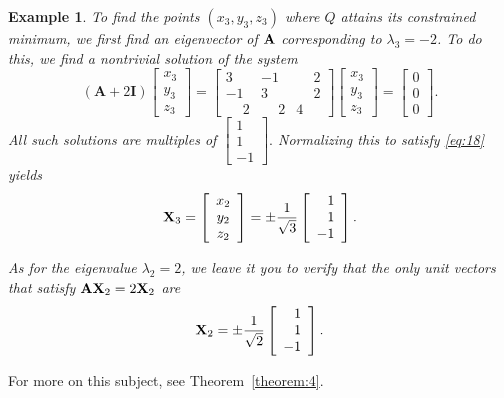\documentclass{article}
\newtheorem{example}{Example}
\begin{document}
\begin{example}
To find the points $(x_{3},y_{3},z_{3})$ where $Q$ attains its
constrained minimum, we first find an eigenvector of ${\bf A}$
corresponding
to $\lambda_{3}=-2$. To do this, we find a nontrivial solution of the
system
$$
(\mathbf{A}+2\mathbf{I})
\left[\begin{array}{ccccccc}
 x_{3}\\ y_{3}\\ z_{3}
\end{array}\right]=
\left[\begin{array}{rrrcccc}
 3 & -1 & \phantom{-}2 \\
-1 & 3 & \phantom{-}2 \\
\phantom{-}2 & \phantom{-}2 & 4
\end{array}\right]
\left[\begin{array}{ccccccc}
x_{3}\\y_{3}\\z_{3}
\end{array}\right]=
\left[\begin{array}{ccccccc}
0\\0\\0
\end{array}\right].
$$
All such solutions are multiples of
$
\left[\begin{array}{rcccccc}
1\\1\\-1
\end{array}\right].
$
Normalizing this  to satisfy \eqref{eq:18} yields
$$
{\bf X}_{3}=
\left[\begin{array}{ccccccc}
x_{2}\\y_{2}\\z_{2}
\end{array}\right]=\pm \frac{1}{\sqrt{3}}
\left[\begin{array}{rcccccc}
1\\ 1\\-1
\end{array}\right].
$$

As for    the eigenvalue $\lambda_{2}=2$, we leave it you to verify that
the only unit vectors   that satisfy
${\bf A}{\bf X}_{2}=2{\bf X}_{2}$ are
$$
{\bf X}_{2}=\pm \frac{1}{\sqrt{2}}
\left[\begin{array}{rcccccc}
1\\ 1\\-1
\end{array}\right].
$$
\end{example}

For more on this subject, see  Theorem~\ref{theorem:4}.
\end{document}
